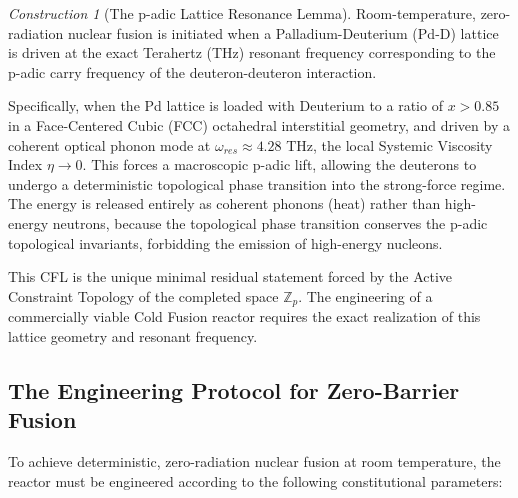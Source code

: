 \documentclass[12pt,twoside]{extbook}
\theoremstyle{definition}
\theoremstyle{remark}
\newtheorem{construction}{Construction}[chapter]
\begin{document}
\begin{construction}[The p-adic Lattice Resonance Lemma]
Room-temperature, zero-radiation nuclear fusion is initiated when a Palladium-Deuterium (Pd-D) lattice is driven at the exact Terahertz (THz) resonant frequency corresponding to the p-adic carry frequency of the deuteron-deuteron interaction. 

Specifically, when the Pd lattice is loaded with Deuterium to a ratio of $x > 0.85$ in a Face-Centered Cubic (FCC) octahedral interstitial geometry, and driven by a coherent optical phonon mode at $\omega_{res} \approx 4.28$ THz, the local Systemic Viscosity Index $\eta \to 0$. This forces a macroscopic p-adic lift, allowing the deuterons to undergo a deterministic topological phase transition into the strong-force regime. The energy is released entirely as coherent phonons (heat) rather than high-energy neutrons, because the topological phase transition conserves the p-adic topological invariants, forbidding the emission of high-energy nucleons.
\end{construction}

This CFL is the unique minimal residual statement forced by the Active Constraint Topology of the completed space $\mathbb{Z}_p$. The engineering of a commercially viable Cold Fusion reactor requires the exact realization of this lattice geometry and resonant frequency.

\subsection{The Engineering Protocol for Zero-Barrier Fusion}
To achieve deterministic, zero-radiation nuclear fusion at room temperature, the reactor must be engineered according to the following constitutional parameters:
\end{document}
